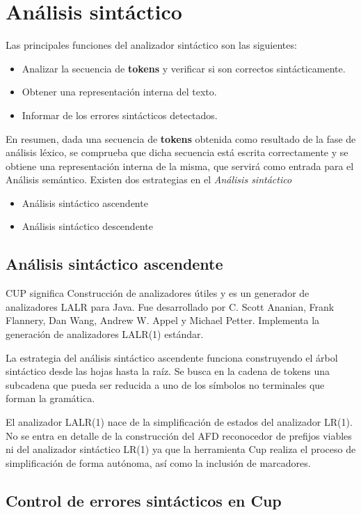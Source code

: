 \documentclass[12pt,a4paper]{article}
\begin{document}
\section{Análisis sintáctico}
Las principales funciones del analizador sintáctico son las siguientes:
\begin{itemize}
	\item Analizar la secuencia de \textbf{tokens} y verificar si son correctos sintácticamente.
	\item Obtener una representación interna del texto.
	\item Informar de los errores sintácticos detectados.
\end{itemize}
En resumen, dada una secuencia de \textbf{tokens} obtenida como resultado de la fase de análisis léxico, se comprueba que dicha secuencia está escrita correctamente y se obtiene una representación interna de la misma, que servirá como entrada para el Análisis semántico. 
\newline
\newline
Existen dos estrategias en el \textit{Análisis sintáctico}
\begin{itemize}
	\item Análisis sintáctico ascendente
	\item Análisis sintáctico descendente
\end{itemize}


\subsection{Análisis sintáctico ascendente}
CUP significa Construcción de analizadores útiles y es un generador de analizadores LALR para Java. Fue desarrollado por C. Scott Ananian, Frank Flannery, Dan Wang, Andrew W. Appel y Michael Petter. Implementa la generación de analizadores LALR(1) estándar. 

La estrategia del análisis sintáctico ascendente funciona construyendo el árbol sintáctico desde las hojas hasta la raíz. Se busca en la cadena de tokens una subcadena que pueda ser reducida a uno de los símbolos no terminales que forman la gramática.

El analizador LALR(1) nace de la simplificación de estados del analizador LR(1). No se entra en detalle de la construcción del AFD reconocedor de prefijos viables ni del analizador sintáctico LR(1) ya que la herramienta Cup realiza el proceso de simplificación de forma autónoma, así como la inclusión de marcadores.

\subsection{Control de errores sintácticos en Cup}
\end{document}
